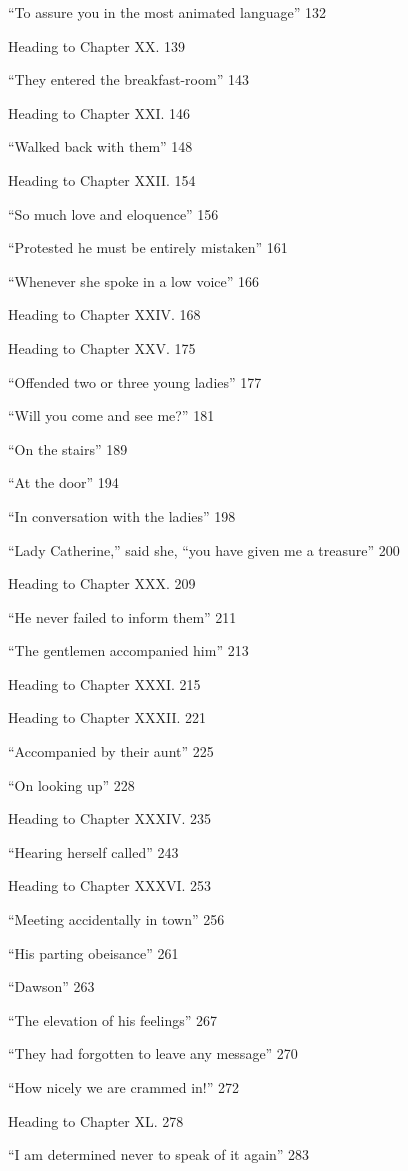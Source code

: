 \documentclass[12pt]{book}
\begin{document}
``To assure you in the most animated language'' 132

Heading to Chapter XX. 139

``They entered the breakfast-room'' 143

Heading to Chapter XXI. 146

``Walked back with them'' 148

Heading to Chapter XXII. 154

``So much love and eloquence'' 156

``Protested he must be entirely mistaken'' 161

``Whenever she spoke in a low voice'' 166

Heading to Chapter XXIV. 168

Heading to Chapter XXV. 175

``Offended two or three young ladies'' 177

``Will you come and see me?'' 181

``On the stairs'' 189

``At the door'' 194

``In conversation with the ladies'' 198

``Lady Catherine,'' said she, ``you have given me a treasure'' 200

Heading to Chapter XXX. 209

``He never failed to inform them'' 211

``The gentlemen accompanied him'' 213

Heading to Chapter XXXI. 215

Heading to Chapter XXXII. 221

``Accompanied by their aunt'' 225

``On looking up'' 228

Heading to Chapter XXXIV. 235

``Hearing herself called'' 243

Heading to Chapter XXXVI. 253

``Meeting accidentally in town'' 256

``His parting obeisance'' 261

``Dawson'' 263

``The elevation of his feelings'' 267

``They had forgotten to leave any message'' 270

``How nicely we are crammed in!'' 272

Heading to Chapter XL. 278

``I am determined never to speak of it again'' 283
\end{document}
